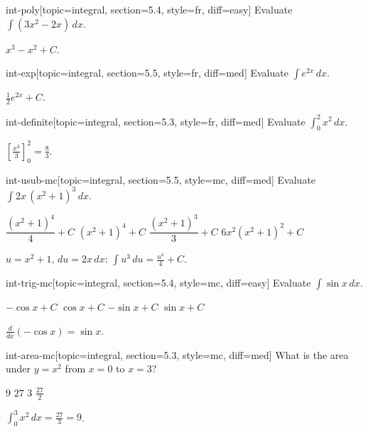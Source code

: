 
\begin{problem}{int-poly}[topic=integral, section=5.4, style=fr, diff=easy]
	Evaluate $\displaystyle \int (3x^2 - 2x)\,dx$.
	\begin{solution} $x^3 - x^2 + C$. \end{solution}
\end{problem}

\begin{problem}{int-exp}[topic=integral, section=5.5, style=fr, diff=med]
	Evaluate $\displaystyle \int e^{2x}\,dx$.
	\begin{solution} $\tfrac{1}{2} e^{2x} + C$. \end{solution}
\end{problem}

\begin{problem}{int-definite}[topic=integral, section=5.3, style=fr, diff=med]
	Evaluate $\displaystyle \int_0^2 x^2 \,dx$.
	\begin{solution} $\left[\tfrac{x^3}{3}\right]_0^2 = \tfrac{8}{3}$. \end{solution}
\end{problem}

\begin{problem}{int-usub-mc}[topic=integral, section=5.5, style=mc, diff=med]
	Evaluate $\displaystyle \int 2x\,(x^2+1)^3 \,dx$.
	\begin{choices}
		\cchoice $\dfrac{(x^2+1)^4}{4} + C$
		\choice $(x^2+1)^4 + C$
		\choice $\dfrac{(x^2+1)^3}{3} + C$
		\choice $6x^2(x^2+1)^2 + C$
	\end{choices}
	\begin{solution} $u = x^2+1$, $du = 2x\,dx$: $\int u^3\,du = \tfrac{u^4}{4}+C$. \end{solution}
\end{problem}

\begin{problem}{int-trig-mc}[topic=integral, section=5.4, style=mc, diff=easy]
	Evaluate $\displaystyle \int \sin x \,dx$.
	\begin{choices}
		\cchoice $-\cos x + C$
		\choice $\cos x + C$
		\choice $-\sin x + C$
		\choice $\sin x + C$
	\end{choices}
	\begin{solution} $\frac{d}{dx}(-\cos x) = \sin x$. \end{solution}
\end{problem}

\begin{problem}{int-area-mc}[topic=integral, section=5.3, style=mc, diff=med]
	What is the area under $y = x^2$ from $x = 0$ to $x = 3$?
	\begin{choices}
		\cchoice $9$
		\choice $27$
		\choice $3$
		\choice $\tfrac{27}{2}$
	\end{choices}
	\begin{solution} $\int_0^3 x^2\,dx = \tfrac{27}{3} = 9$. \end{solution}
\end{problem}
